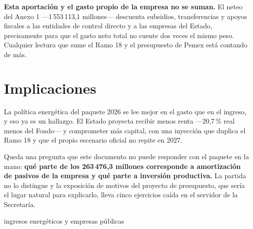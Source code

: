 \textbf{Esta aportación y el gasto propio de la empresa no se suman.} El neteo del Anexo 1
---1\,553\,113,1 millones--- descuenta subsidios, transferencias y apoyos fiscales a las
entidades de control directo y a las empresas del Estado, precisamente para que el gasto neto
total no cuente dos veces el mismo peso. Cualquier lectura que sume el Ramo 18 y el
presupuesto de Pemex está contando de más.

\section{Implicaciones}

La política energética del paquete 2026 se lee mejor en el gasto que en el ingreso, y eso ya
es un hallazgo. El Estado proyecta recibir menos renta ---20,7\,\% real menos del Fondo--- y
comprometer más capital, con una inyección que duplica el Ramo 18 y que el propio escenario
oficial no repite en 2027.

Queda una pregunta que este documento no puede responder con el paquete en la mano:
\textbf{qué parte de los 263\,476,3 millones corresponde a amortización de pasivos de la
empresa y qué parte a inversión productiva.} La partida no lo distingue y la exposición de
motivos del proyecto de presupuesto, que sería el lugar natural para explicarlo, lleva cinco
ejercicios caída en el servidor de la Secretaría.

\begin{ficha}{ingresos energéticos y empresas públicas}
\end{ficha}
\clearpage
